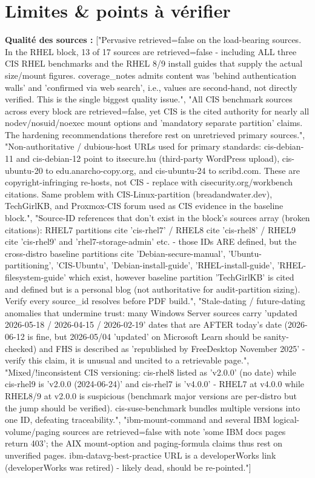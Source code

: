 \documentclass[10pt,a4paper]{article}
\begin{document}
\section{Limites \& points à v\'erifier}
\noindent\textbf{Qualit\'e des sources :} ["Pervasive retrieved=false on the load-bearing sources. In the RHEL block, 13 of 17 sources are retrieved=false - including ALL three CIS RHEL benchmarks and the RHEL 8/9 install guides that supply the actual size/mount figures. coverage\_notes admits content was 'behind authentication walls' and 'confirmed via web search', i.e., values are second-hand, not directly verified. This is the single biggest quality issue.", "All CIS benchmark sources across every block are retrieved=false, yet CIS is the cited authority for nearly all nodev/nosuid/noexec mount options and 'mandatory separate partition' claims. The hardening recommendations therefore rest on unretrieved primary sources.", "Non-authoritative / dubious-host URLs used for primary standards: cis-debian-11 and cis-debian-12 point to itsecure.hu (third-party WordPress upload), cis-ubuntu-20 to edu.anarcho-copy.org, and cis-ubuntu-24 to scribd.com. These are copyright-infringing re-hosts, not CIS - replace with cisecurity.org/workbench citations. Same problem with CIS-Linux-partition (breadandwater.dev), TechGirlKB, and Proxmox-CIS forum used as CIS evidence in the baseline block.", "Source-ID references that don't exist in the block's sources array (broken citations): RHEL7 partitions cite 'cis-rhel7' / RHEL8 cite 'cis-rhel8' / RHEL9 cite 'cis-rhel9' and 'rhel7-storage-admin' etc. - those IDs ARE defined, but the cross-distro baseline partitions cite 'Debian-secure-manual', 'Ubuntu-partitioning', 'CIS-Ubuntu', 'Debian-install-guide', 'RHEL-install-guide', 'RHEL-filesystem-guide' which exist, however baseline partition 'TechGirlKB' is cited and defined but is a personal blog (not authoritative for audit-partition sizing). Verify every source\_id resolves before PDF build.", "Stale-dating / future-dating anomalies that undermine trust: many Windows Server sources carry 'updated 2026-05-18 / 2026-04-15 / 2026-02-19' dates that are AFTER today's date (2026-06-12 is fine, but 2026-05/04 'updated' on Microsoft Learn should be sanity-checked) and FHS is described as 'republished by FreeDesktop November 2025' - verify this claim, it is unusual and uncited to a retrievable page.", "Mixed/!inconsistent CIS versioning: cis-rhel8 listed as 'v2.0.0' (no date) while cis-rhel9 is 'v2.0.0 (2024-06-24)' and cis-rhel7 is 'v4.0.0' - RHEL7 at v4.0.0 while RHEL8/9 at v2.0.0 is suspicious (benchmark major versions are per-distro but the jump should be verified). cis-suse-benchmark bundles multiple versions into one ID, defeating traceability.", "ibm-mount-command and several IBM logical-volume/paging sources are retrieved=false with note 'some IBM docs pages return 403'; the AIX mount-option and paging-formula claims thus rest on unverified pages. ibm-datavg-best-practice URL is a developerWorks link (developerWorks was retired) - likely dead, should be re-pointed."]\par\medskip
\end{document}
